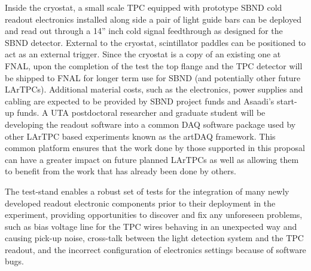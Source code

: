 Inside the cryostat, a small scale TPC equipped with prototype SBND cold readout electronics installed along side a pair of light guide bars can be deployed and read out through a 14'' inch cold signal feedthrough as designed for the SBND detector. External to the cryostat, scintillator paddles can be positioned to act as an external trigger. Since the cryostat is a copy of an existing one at FNAL, upon the completion of the test the top flange and the TPC detector will be shipped to FNAL for longer term use for SBND (and potentially other future LArTPCs). Additional material costs, such as the electronics, power supplies and cabling are expected to be provided by SBND project funds and Asaadi's start-up funds. A UTA postdoctoral researcher and graduate student will be developing the readout software into a common DAQ software package used by other LArTPC based experiments known as the artDAQ framework. This common platform ensures that the work done by those supported in this proposal can have a greater impact on future planned LArTPCs as well as allowing them to benefit from the work that has already been done by others.

The test-stand enables a robust set of tests for the integration of many newly developed readout electronic components prior to their deployment in the experiment, providing opportunities to discover and fix any unforeseen problems, such as bias voltage line for the TPC wires behaving in an unexpected way and causing pick-up noise, cross-talk between the light detection system and the TPC readout, and the incorrect configuration of electronics settings because of software bugs.   

 


